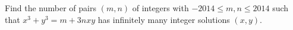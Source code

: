 Find the number of pairs $(m,n)$ of integers with $-2014\le m,n\le 2014$ such that $x^3+y^3 = m + 3nxy$ has infinitely many integer solutions $(x,y)$.
